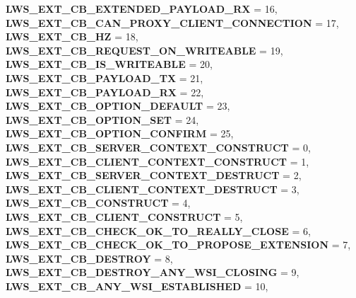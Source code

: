 \begin{DoxyCompactItemize}
\newline
{\bfseries L\+W\+S\+\_\+\+E\+X\+T\+\_\+\+C\+B\+\_\+\+E\+X\+T\+E\+N\+D\+E\+D\+\_\+\+P\+A\+Y\+L\+O\+A\+D\+\_\+\+RX} = 16, 
{\bfseries L\+W\+S\+\_\+\+E\+X\+T\+\_\+\+C\+B\+\_\+\+C\+A\+N\+\_\+\+P\+R\+O\+X\+Y\+\_\+\+C\+L\+I\+E\+N\+T\+\_\+\+C\+O\+N\+N\+E\+C\+T\+I\+ON} = 17, 
{\bfseries L\+W\+S\+\_\+\+E\+X\+T\+\_\+\+C\+B\+\_\+HZ} = 18, 
{\bfseries L\+W\+S\+\_\+\+E\+X\+T\+\_\+\+C\+B\+\_\+\+R\+E\+Q\+U\+E\+S\+T\+\_\+\+O\+N\+\_\+\+W\+R\+I\+T\+E\+A\+B\+LE} = 19, 
\newline
{\bfseries L\+W\+S\+\_\+\+E\+X\+T\+\_\+\+C\+B\+\_\+\+I\+S\+\_\+\+W\+R\+I\+T\+E\+A\+B\+LE} = 20, 
{\bfseries L\+W\+S\+\_\+\+E\+X\+T\+\_\+\+C\+B\+\_\+\+P\+A\+Y\+L\+O\+A\+D\+\_\+\+TX} = 21, 
{\bfseries L\+W\+S\+\_\+\+E\+X\+T\+\_\+\+C\+B\+\_\+\+P\+A\+Y\+L\+O\+A\+D\+\_\+\+RX} = 22, 
{\bfseries L\+W\+S\+\_\+\+E\+X\+T\+\_\+\+C\+B\+\_\+\+O\+P\+T\+I\+O\+N\+\_\+\+D\+E\+F\+A\+U\+LT} = 23, 
\newline
{\bfseries L\+W\+S\+\_\+\+E\+X\+T\+\_\+\+C\+B\+\_\+\+O\+P\+T\+I\+O\+N\+\_\+\+S\+ET} = 24, 
{\bfseries L\+W\+S\+\_\+\+E\+X\+T\+\_\+\+C\+B\+\_\+\+O\+P\+T\+I\+O\+N\+\_\+\+C\+O\+N\+F\+I\+RM} = 25, 
{\bfseries L\+W\+S\+\_\+\+E\+X\+T\+\_\+\+C\+B\+\_\+\+S\+E\+R\+V\+E\+R\+\_\+\+C\+O\+N\+T\+E\+X\+T\+\_\+\+C\+O\+N\+S\+T\+R\+U\+CT} = 0, 
{\bfseries L\+W\+S\+\_\+\+E\+X\+T\+\_\+\+C\+B\+\_\+\+C\+L\+I\+E\+N\+T\+\_\+\+C\+O\+N\+T\+E\+X\+T\+\_\+\+C\+O\+N\+S\+T\+R\+U\+CT} = 1, 
\newline
{\bfseries L\+W\+S\+\_\+\+E\+X\+T\+\_\+\+C\+B\+\_\+\+S\+E\+R\+V\+E\+R\+\_\+\+C\+O\+N\+T\+E\+X\+T\+\_\+\+D\+E\+S\+T\+R\+U\+CT} = 2, 
{\bfseries L\+W\+S\+\_\+\+E\+X\+T\+\_\+\+C\+B\+\_\+\+C\+L\+I\+E\+N\+T\+\_\+\+C\+O\+N\+T\+E\+X\+T\+\_\+\+D\+E\+S\+T\+R\+U\+CT} = 3, 
{\bfseries L\+W\+S\+\_\+\+E\+X\+T\+\_\+\+C\+B\+\_\+\+C\+O\+N\+S\+T\+R\+U\+CT} = 4, 
{\bfseries L\+W\+S\+\_\+\+E\+X\+T\+\_\+\+C\+B\+\_\+\+C\+L\+I\+E\+N\+T\+\_\+\+C\+O\+N\+S\+T\+R\+U\+CT} = 5, 
\newline
{\bfseries L\+W\+S\+\_\+\+E\+X\+T\+\_\+\+C\+B\+\_\+\+C\+H\+E\+C\+K\+\_\+\+O\+K\+\_\+\+T\+O\+\_\+\+R\+E\+A\+L\+L\+Y\+\_\+\+C\+L\+O\+SE} = 6, 
{\bfseries L\+W\+S\+\_\+\+E\+X\+T\+\_\+\+C\+B\+\_\+\+C\+H\+E\+C\+K\+\_\+\+O\+K\+\_\+\+T\+O\+\_\+\+P\+R\+O\+P\+O\+S\+E\+\_\+\+E\+X\+T\+E\+N\+S\+I\+ON} = 7, 
{\bfseries L\+W\+S\+\_\+\+E\+X\+T\+\_\+\+C\+B\+\_\+\+D\+E\+S\+T\+R\+OY} = 8, 
{\bfseries L\+W\+S\+\_\+\+E\+X\+T\+\_\+\+C\+B\+\_\+\+D\+E\+S\+T\+R\+O\+Y\+\_\+\+A\+N\+Y\+\_\+\+W\+S\+I\+\_\+\+C\+L\+O\+S\+I\+NG} = 9, 
\newline
{\bfseries L\+W\+S\+\_\+\+E\+X\+T\+\_\+\+C\+B\+\_\+\+A\+N\+Y\+\_\+\+W\+S\+I\+\_\+\+E\+S\+T\+A\+B\+L\+I\+S\+H\+ED} = 10, 

\end{DoxyCompactItemize}
